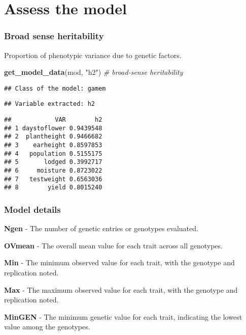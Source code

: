 \documentclass[
]{article}
\newenvironment{Shaded}{\begin{snugshade}}{\end{snugshade}}
\newcommand{\CommentTok}[1]{\textcolor[rgb]{0.56,0.35,0.01}{\textit{#1}}}
\newcommand{\FunctionTok}[1]{\textcolor[rgb]{0.13,0.29,0.53}{\textbf{#1}}}
\newcommand{\NormalTok}[1]{#1}
\newcommand{\StringTok}[1]{\textcolor[rgb]{0.31,0.60,0.02}{#1}}
\begin{document}
\section{Assess the model}\label{assess-the-model}

\subsubsection{Broad sense heritability}\label{broad-sense-heritability}

Proportion of phenotypic variance due to genetic factors.

\begin{Shaded}
\begin{Highlighting}[]
\FunctionTok{get\_model\_data}\NormalTok{(mod, }\StringTok{"h2"}\NormalTok{) }\CommentTok{\# broad{-}sense heritability}
\end{Highlighting}
\end{Shaded}

\begin{verbatim}
## Class of the model: gamem
\end{verbatim}

\begin{verbatim}
## Variable extracted: h2
\end{verbatim}

\begin{verbatim}
##            VAR        h2
## 1 daystoflower 0.9439548
## 2  plantheight 0.9466682
## 3    earheight 0.8597853
## 4   population 0.5155175
## 5       lodged 0.3992717
## 6     moisture 0.8723022
## 7   testweight 0.6563036
## 8        yield 0.8015240
\end{verbatim}

\subsubsection{Model details}\label{model-details}

\textbf{Ngen} - The number of genetic entries or genotypes evaluated.

\textbf{OVmean} - The overall mean value for each trait across all
genotypes.

\textbf{Min} - The minimum observed value for each trait, with the
genotype and replication noted.

\textbf{Max} - The maximum observed value for each trait, with the
genotype and replication noted.

\textbf{MinGEN} - The minimum genetic value for each trait, indicating
the lowest value among the genotypes.
\end{document}

